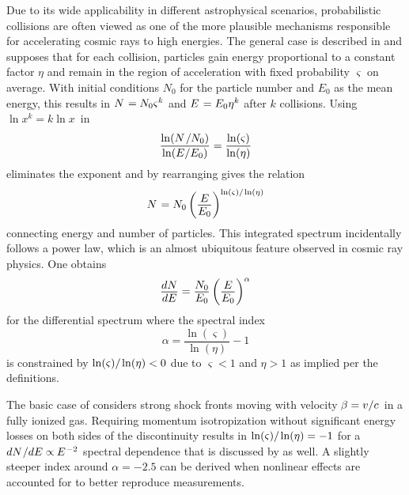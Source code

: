 Due to its wide applicability in different astrophysical scenarios, probabilistic collisions are often viewed as one of
the more plausible mechanisms responsible for accelerating cosmic rays to high energies. The general case is described in
\cite{Longair_2011} and supposes that for each collision, particles gain energy proportional to a constant factor $\eta$ and
remain in the region of acceleration with fixed probability $\varsigma$ on average. With initial conditions $N_0$ for the
particle number and $E_0$ as the mean energy, this results in $N \kern+0.9pt = N_0 \varsigma^k$ and $E \kern+0.9pt = E_0 \eta^k$
after $k$ collisions. Using $\ln x^k = k\ln x$~in
\begin{equation*}
	\frac{\ln (N \kern+1.0pt / N_0)}{\ln (E / E_0)} = \frac{\ln(\varsigma)}{\ln(\eta)}
\end{equation*}
eliminates the exponent and by rearranging gives the relation
\begin{equation*}
	N \kern+0.9pt = N_0 \left( \frac{\raisebox{-0.3ex}{$E$}}{\raisebox{0.3ex}{$E_0$}} \right)^{\ln(\varsigma) / \kern-0.5pt \ln(\eta)}
\end{equation*}
connecting energy and number of particles. This integrated spectrum incidentally follows a power law, which is an almost
ubiquitous feature observed in cosmic ray physics. One obtains
\begin{equation*}
	\frac{\raisebox{-0.3ex}{$dN$}}{\raisebox{0.3ex}{$dE$}} = \frac{\raisebox{-0.3ex}{$N_0$}}{\raisebox{0.3ex}{$E_0$}}
	\left( \frac{\raisebox{-0.3ex}{$E$}}{\raisebox{0.3ex}{$E_0$}} \right)^\alpha
\end{equation*}
for the differential spectrum where the spectral index
\begin{equation*}
	\alpha = \frac{\ln(\varsigma)}{\ln(\eta)} - 1
\end{equation*}
is constrained by $\ln(\varsigma) / \kern-0.5pt \ln(\eta) < 0$ due to $\varsigma < 1$ and $\eta > 1$ as implied per the definitions.

The basic case of  considers strong shock fronts moving with velocity $\kern-0.5pt \beta = v / c \kern+1.0pt$ in a
fully ionized gas. Requiring momentum isotropization without significant energy losses on both sides of the discontinuity results
in $\ln(\varsigma) / \kern-0.5pt \ln(\eta) = -1$ for a $dN \kern+0.5pt / dE \propto \kern-0.5pt E^{\kern+0.5pt -2}$ spectral dependence
that is discussed by \cite{Longair_2011} as well. A slightly steeper index around $\alpha = \num{-2.5}$ can be derived when nonlinear
effects are accounted for to better reproduce measurements.

